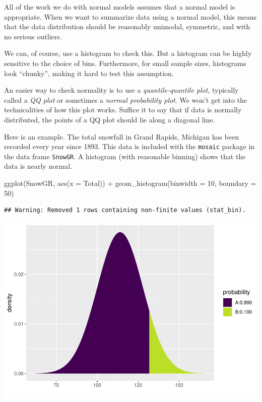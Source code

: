 \documentclass[
]{book}
\newenvironment{Shaded}{\begin{snugshade}}{\end{snugshade}}
\newcommand{\AttributeTok}[1]{\textcolor[rgb]{0.77,0.63,0.00}{#1}}
\newcommand{\DecValTok}[1]{\textcolor[rgb]{0.00,0.00,0.81}{#1}}
\newcommand{\FunctionTok}[1]{\textcolor[rgb]{0.00,0.00,0.00}{#1}}
\newcommand{\NormalTok}[1]{#1}
\newcommand{\SpecialCharTok}[1]{\textcolor[rgb]{0.00,0.00,0.00}{#1}}
\begin{document}
All of the work we do with normal models assumes that a normal model is appropriate. When we want to summarize data using a normal model, this means that the data distribution should be reasonably unimodal, symmetric, and with no serious outliers.

We can, of course, use a histogram to check this. But a histogram can be highly sensitive to the choice of bins. Furthermore, for small sample sizes, histograms look ``chunky'', making it hard to test this assumption.

An easier way to check normality is to use a \emph{quantile-quantile plot}, typically called a \emph{QQ plot} or sometimes a \emph{normal probability plot}. We won't get into the technicalities of how this plot works. Suffice it to say that if data is normally distributed, the points of a QQ plot should lie along a diagonal line.

Here is an example. The total snowfall in Grand Rapids, Michigan has been recorded every year since 1893. This data is included with the \texttt{mosaic} package in the data frame \texttt{SnowGR}. A histogram (with reasonable binning) shows that the data is nearly normal.

\begin{Shaded}
\begin{Highlighting}[]
\FunctionTok{ggplot}\NormalTok{(SnowGR, }\FunctionTok{aes}\NormalTok{(}\AttributeTok{x =}\NormalTok{ Total)) }\SpecialCharTok{+}
    \FunctionTok{geom\_histogram}\NormalTok{(}\AttributeTok{binwidth =} \DecValTok{10}\NormalTok{, }\AttributeTok{boundary =} \DecValTok{50}\NormalTok{)}
\end{Highlighting}
\end{Shaded}

\begin{verbatim}
## Warning: Removed 1 rows containing non-finite values (stat_bin).
\end{verbatim}

\includegraphics{intro_stats_files/figure-latex/unnamed-chunk-358-1.pdf}
\end{document}
